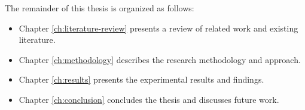 The remainder of this thesis is organized as follows:

\begin{itemize}
    \item Chapter \ref{ch:literature-review} presents a review of related work and existing literature.
    \item Chapter \ref{ch:methodology} describes the research methodology and approach.
    \item Chapter \ref{ch:results} presents the experimental results and findings.
    \item Chapter \ref{ch:conclusion} concludes the thesis and discusses future work.
\end{itemize}
